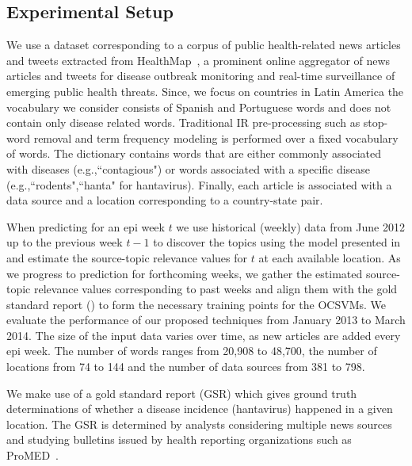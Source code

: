 \documentclass[conference]{IEEEtran}
\begin{document}

\subsection{Experimental Setup}
 We use a dataset corresponding to a corpus of public health-related news articles and tweets extracted from HealthMap~\cite{healthmap}, a prominent online aggregator of news articles and tweets for disease outbreak monitoring and real-time surveillance of emerging public health threats. Since, we focus on countries in Latin America the vocabulary we consider consists of Spanish and Portuguese words and does not contain only disease related words. Traditional IR pre-processing such as stop-word removal and term frequency modeling is performed over a fixed vocabulary of words. The dictionary contains words that are either commonly associated with diseases (e.g.,``contagious") or words associated with a specific disease (e.g.,``rodents",``hanta" for hantavirus). Finally, each article is associated with a data source and a location corresponding to a country-state pair.

When predicting for an epi week $t$ we use historical (weekly) data from June 2012 up to the previous week $t-1$ to discover the topics using the model presented in  and estimate the source-topic relevance values for $t$ at each available location. As we progress to prediction for forthcoming weeks, we gather the estimated source-topic relevance values corresponding to past weeks and align them with the gold standard report () to  form the necessary training points for the OCSVMs. We evaluate the performance of our proposed techniques from January 2013 to March 2014. The size of the input data varies over time, as new articles are added every epi week. The number of words ranges from 20,908 to 48,700, the number of locations from 74 to 144 and the number of data sources from 381 to 798.

 We make use of a gold standard report (GSR) which gives ground truth determinations of whether a disease incidence (hantavirus) happened in a given location. The GSR is determined by analysts considering multiple news sources and studying bulletins issued by health reporting organizations such as ProMED~\cite{probmed}.
\end{document}

